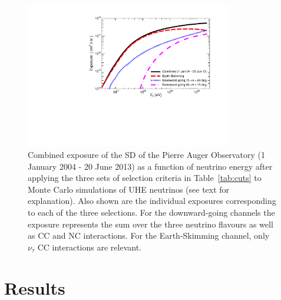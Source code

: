 \documentclass[reprint,showpacs,showkeys,amsmath,amssymb,aps,nofootinbib]{revtex4-1}
\begin{document}
\begin{figure}[!t]
\centering
\includegraphics[width=9.0cm]{./exposure_combined_ageing.pdf}
\vskip -3mm
\caption{
Combined exposure of the SD of the Pierre Auger Observatory
(1 January 2004 - 20 June 2013)
as a function of neutrino energy after applying the three sets 
of selection criteria in Table~\ref{tab:cuts}
to Monte Carlo simulations of UHE neutrinos (see text for explanation). Also shown are 
the individual exposures corresponding to each of the three selections.
For the downward-going channels the exposure represents the sum over the
three neutrino flavours as well as CC and NC interactions.
For the Earth-Skimming channel, only $\nu_\tau$ CC interactions are relevant.
}
\label{fig:exposure}
\end{figure}

\section{Results}
\end{document}
